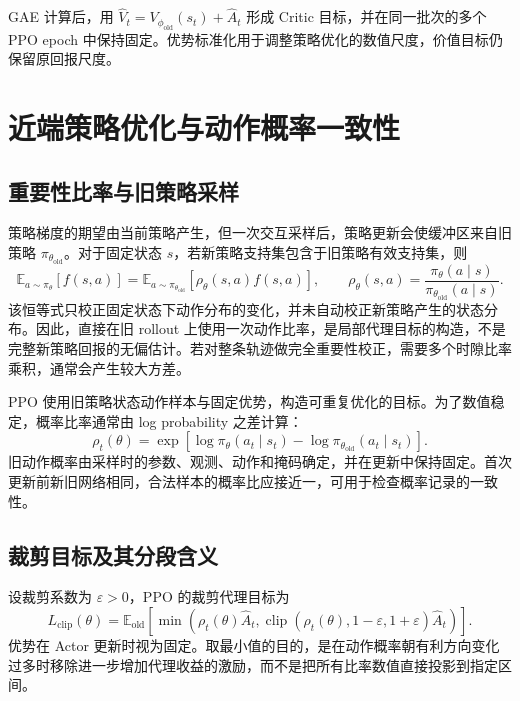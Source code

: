 GAE 计算后，用 $\widehat V_t=V_{\phi_{\mathrm{old}}}(s_t)+\widehat A_t$ 形成 Critic 目标，并在同一批次的多个 PPO epoch 中保持固定。优势标准化用于调整策略优化的数值尺度，价值目标仍保留原回报尺度。

\section{近端策略优化与动作概率一致性}
\label{sec:ch2-ppo}

\subsection{重要性比率与旧策略采样}
\label{sec:ch2-importance-ratio}

策略梯度的期望由当前策略产生，但一次交互采样后，策略更新会使缓冲区来自旧策略 $\pi_{\theta_{\mathrm{old}}}$。对于固定状态 $s$，若新策略支持集包含于旧策略有效支持集，则
\begin{equation}
    \mathbb E_{a\sim\pi_\theta}[f(s,a)]
    =\mathbb E_{a\sim\pi_{\theta_{\mathrm{old}}}}
       \left[\rho_\theta(s,a)f(s,a)\right],\qquad
    \rho_\theta(s,a)=\frac{\pi_\theta(a\mid s)}{\pi_{\theta_{\mathrm{old}}}(a\mid s)}.
    \label{eq:ch2-importance}
\end{equation}
该恒等式只校正固定状态下动作分布的变化，并未自动校正新策略产生的状态分布。因此，直接在旧 rollout 上使用一次动作比率，是局部代理目标的构造，不是完整新策略回报的无偏估计。若对整条轨迹做完全重要性校正，需要多个时隙比率乘积，通常会产生较大方差。

PPO 使用旧策略状态动作样本与固定优势，构造可重复优化的目标\cite{schulman2017proximal}。为了数值稳定，概率比率通常由 log probability 之差计算：
\begin{equation}
    \rho_t(\theta)=\exp\left[\log\pi_\theta(a_t\mid s_t)
                         -\log\pi_{\theta_{\mathrm{old}}}(a_t\mid s_t)\right].
    \label{eq:ch2-log-ratio}
\end{equation}
旧动作概率由采样时的参数、观测、动作和掩码确定，并在更新中保持固定。首次更新前新旧网络相同，合法样本的概率比应接近一，可用于检查概率记录的一致性。

\subsection{裁剪目标及其分段含义}
\label{sec:ch2-clip-objective}

设裁剪系数为 $\varepsilon>0$，PPO 的裁剪代理目标为
\begin{equation}
    L_{\mathrm{clip}}(\theta)=\mathbb E_{\mathrm{old}}\left[
       \min\left(\rho_t(\theta)\widehat A_t,
       \operatorname{clip}(\rho_t(\theta),1-\varepsilon,1+\varepsilon)\widehat A_t\right)\right].
    \label{eq:ch2-ppo-clip}
\end{equation}
优势在 Actor 更新时视为固定。取最小值的目的，是在动作概率朝有利方向变化过多时移除进一步增加代理收益的激励，而不是把所有比率数值直接投影到指定区间。


